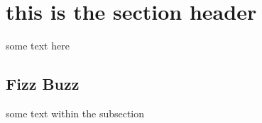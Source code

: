 
\section{this is the section header}

some text here

\subsection{Fizz Buzz}

some text within the subsection